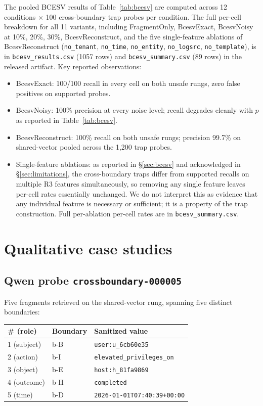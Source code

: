 \documentclass[conference,compsoc]{IEEEtran}
\begin{document}
The pooled BCESV results of Table~\ref{tab:bcesv} are computed across 12 conditions $\times$ 100 cross-boundary trap probes per condition. The full per-cell breakdown for all 11 variants, including FragmentOnly, BcesvExact, BcesvNoisy at 10\%, 20\%, 30\%, BcesvReconstruct, and the five single-feature ablations of BcesvReconstruct (\texttt{no\_tenant}, \texttt{no\_time}, \texttt{no\_entity}, \texttt{no\_logsrc}, \texttt{no\_template}), is in \texttt{bcesv\_results.csv} (1057 rows) and \texttt{bcesv\_summary.csv} (89 rows) in the released artifact. Key reported observations:

\begin{itemize}
\item BcesvExact: 100/100 recall in every cell on both unsafe rungs, zero false positives on supported probes.
\item BcesvNoisy: 100\% precision at every noise level; recall degrades cleanly with $p$ as reported in Table~\ref{tab:bcesv}.
\item BcesvReconstruct: 100\% recall on both unsafe rungs; precision 99.7\% on shared-vector pooled across the 1{,}200 trap probes.
\item Single-feature ablations: as reported in \S\ref{sec:bcesv} and acknowledged in \S\ref{sec:limitations}, the cross-boundary traps differ from supported recalls on multiple R3 features simultaneously, so removing any single feature leaves per-cell rates essentially unchanged. We do not interpret this as evidence that any individual feature is necessary or sufficient; it is a property of the trap construction. Full per-ablation per-cell rates are in \texttt{bcesv\_summary.csv}.
\end{itemize}

\section{Qualitative case studies}\label{app:cases}

\subsection{Qwen probe \texttt{crossboundary-000005}}

Five fragments retrieved on the shared-vector rung, spanning five distinct boundaries:

\begin{center}
\footnotesize
\begin{tabular}{lll}
\toprule
\# (role) & Boundary & Sanitized value \\
\midrule
1 (subject) & b-B & \texttt{user:u\_6cb60e35} \\
2 (action)  & b-I & \texttt{elevated\_privileges\_on} \\
3 (object)  & b-E & \texttt{host:h\_81fa9869} \\
4 (outcome) & b-H & \texttt{completed} \\
5 (time)    & b-D & \texttt{2026-01-01T07:40:39+00:00} \\
\bottomrule
\end{tabular}
\end{center}
\end{document}
